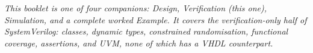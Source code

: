 \cleardoublepage
\thispagestyle{empty}
\vspace*{\fill}
\begin{center}
\begin{minipage}{0.78\textwidth}
\small\itshape
This booklet is one of four companions: Design, Verification (this one),
Simulation, and a complete worked Example. It covers the verification-only
half of SystemVerilog: classes, dynamic types, constrained randomisation,
functional coverage, assertions, and UVM, none of which has a VHDL
counterpart.
\end{minipage}
\end{center}
\vspace*{\fill}
\cleardoublepage
